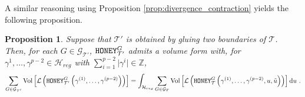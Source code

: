 \documentclass[11pt,a4paper]{amsart}
\providecommand{\diff}{\mathrm d}
\providecommand{\Vol}{\operatorname{Vol}}
\providecommand{\honey}{\texttt{\textsc{HONEY}}}
\numberwithin{equation}{section}
\newtheorem{proposition}[theorem]{Proposition}
\theoremstyle{definition}
\begin{document}
\noindent
A similar reasoning using Proposition \ref{prop:divergence_contraction} 
yields the following proposition.
\begin{proposition}
    \label{prop:formula_contracting_honey}
Suppose that $\mathcal{T}'$ is obtained by gluing two boundaries of $\mathcal{T}$. 
Then, for each $G\in \mathcal{G}_{\mathcal{T}'}$, $\honey_{\mathcal{T}'}^{G}$ admits 
a volume form with, for $\gamma^1,\ldots,\gamma^{p-2}\in \mathcal{H}_{reg}$ 
with $\sum_{i=1}^{p-2}\vert \gamma^i\vert\in\mathbb{Z}$,
\begin{align*}
\sum_{G\in\mathcal{G}_{\mathcal{T}'}} 
\Vol \left[\mathcal{L}\left(\honey_{\mathcal{T}'}^G \left(\gamma^{(1)}, 
    \ldots,\gamma^{(p-2)}\right)\right)\right] = 
    \int_{\mathcal{H}_{reg}} 
    \sum_{G\in\mathcal{G}_{T}} 
    \Vol \left[\mathcal{L}\left(\honey_{\mathcal{T}}^G\left(\gamma^{(1)}, 
    \ldots,\gamma^{(p-2)}, u , \tilde{u}\right)\right)\right] \diff u \ .
\end{align*}
\end{proposition}





\end{document}
